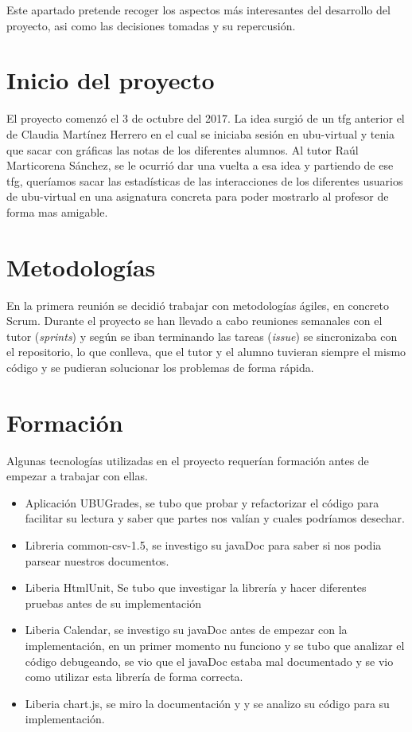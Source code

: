 
Este apartado pretende recoger los aspectos más interesantes del desarrollo del proyecto, asi como las decisiones tomadas y su repercusión.

\section{Inicio del proyecto}\label{inicio-del-proyecto}

El proyecto comenzó el 3 de octubre del 2017. La idea surgió de un tfg anterior el de Claudia Martínez Herrero \cite{claudia} en el cual se iniciaba sesión en ubu-virtual y tenia que sacar con gráficas las notas de los diferentes alumnos. Al tutor Raúl Marticorena Sánchez, se le ocurrió dar una vuelta a esa idea y partiendo de ese tfg, queríamos sacar las estadísticas de las interacciones de los diferentes usuarios de ubu-virtual en una asignatura concreta para poder mostrarlo al profesor de forma mas amigable.


\section{Metodologías}\label{metodologias-proyecto}

En la primera reunión se decidió trabajar con metodologías ágiles, en concreto Scrum. Durante el proyecto se han llevado a cabo reuniones semanales con el tutor (\emph{sprints}) y según se iban terminando las tareas (\emph{issue}) se sincronizaba con el repositorio, lo que conlleva, que el tutor y el alumno tuvieran siempre el mismo código y se pudieran solucionar los problemas de forma rápida.

\section{Formación}\label{formacion}

Algunas tecnologías utilizadas en el proyecto requerían formación antes de empezar a trabajar con ellas.

\begin{itemize}
	\tightlist
	\item
	Aplicación UBUGrades, se tubo que probar y refactorizar el código para facilitar su lectura y saber que partes nos valían y cuales podríamos desechar.
	\item
	Libreria common-csv-1.5, se investigo su javaDoc para saber si nos podia parsear nuestros documentos.
	\item
	Liberia HtmlUnit, Se tubo que investigar la librería y hacer diferentes pruebas antes de su implementación
	\item
	Liberia Calendar, se investigo su javaDoc antes de empezar con la implementación, en un primer momento nu funciono y se tubo que analizar el código debugeando, se vio que el javaDoc estaba mal documentado y se vio como utilizar esta librería de forma correcta.
	\item
	Liberia chart.js, se miro la documentación \cite{javascript:chart} y y se analizo su código para su implementación.
\end{itemize}

